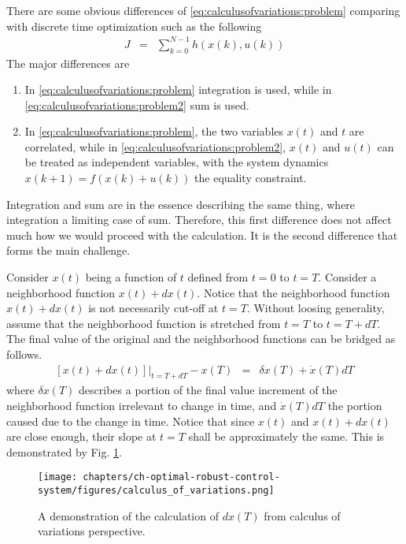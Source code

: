 There are some obvious differences of \eqref{eq:calculusofvariations:problem} comparing with discrete time optimization such as the following
\begin{eqnarray}
	J &=& \sum_{k=0}^{N-1} h\left(x(k), u(k)\right) \label{eq:calculusofvariations:problem2}
\end{eqnarray}
The major differences are
\begin{enumerate}
	\item In \eqref{eq:calculusofvariations:problem} integration is used, while in \eqref{eq:calculusofvariations:problem2} sum is used.
	\item In \eqref{eq:calculusofvariations:problem}, the two variables $x(t)$ and $t$ are correlated, while in \eqref{eq:calculusofvariations:problem2}, $x(t)$ and $u(t)$ can be treated as independent variables, with the system dynamics $x(k+1) = f\left(x(k) + u(k)\right)$ the equality constraint.
\end{enumerate}
Integration and sum are in the essence describing the same thing, where integration a limiting case of sum. Therefore, this first difference does not affect much how we would proceed with the calculation. It is the second difference that forms the main challenge.

Consider $x(t)$ being a function of $t$ defined from $t=0$ to $t=T$. Consider a neighborhood function $x(t) + dx(t)$. Notice that the neighborhood function $x(t) + dx(t)$ is not necessarily cut-off at $t=T$. Without loosing generality, assume that the neighborhood function is stretched from $t=T$ to $t=T+dT$. The final value of the original and the neighborhood functions can be bridged as follows.
\begin{eqnarray}
	\left.\left[x(t) + dx(t)\right]\right|_{t=T+dT} - x(T) &=& \delta x(T) + \dot{x}(T)dT \nonumber
\end{eqnarray}
where $\delta x(T)$ describes a portion of the final value increment of the neighborhood function irrelevant to change in time, and $\dot{x}(T)dT$ the portion caused due to the change in time. Notice that since $x(t)$ and $x(t)+dx(t)$ are close enough, their slope at $t=T$ shall be approximately the same. This is demonstrated by Fig. \ref{fig:calculusofvariations:calculus_of_variations}.

\begin{figure}
	\centering
	\texttt{[image: chapters/ch-optimal-robust-control-system/figures/calculus\_of\_variations.png]}
	\caption{A demonstration of the calculation of $dx(T)$ from calculus of variations perspective.}
	\label{fig:calculusofvariations:calculus_of_variations}
\end{figure}


